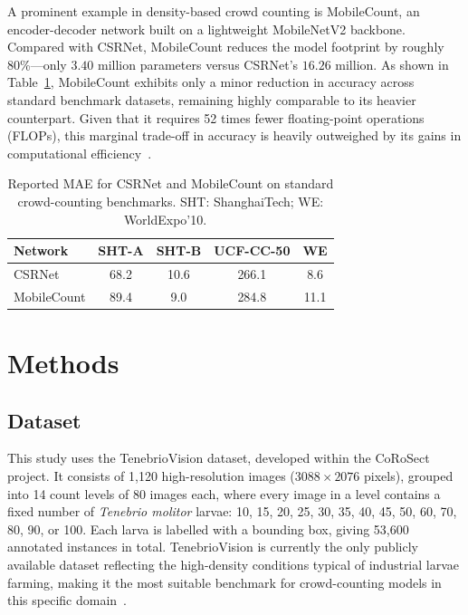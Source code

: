 \documentclass[conference]{IEEEtran}
\begin{document}
A prominent example in density-based crowd counting is MobileCount, an
encoder-decoder network built on a lightweight MobileNetV2 backbone. Compared
with CSRNet, MobileCount reduces the model footprint by roughly 80\%---only
$3.40$ million parameters versus CSRNet's $16.26$ million. As shown in
Table~\ref{tab:lit_table}, MobileCount exhibits only a minor reduction in
accuracy across standard benchmark datasets, remaining highly comparable to its
heavier counterpart. Given that it requires 52 times fewer floating-point
operations (FLOPs), this marginal trade-off in accuracy is heavily outweighed by
its gains in computational efficiency~\cite{wang2020mobilecount}.

\begin{table}[t]
    \centering
    \caption{Reported MAE for CSRNet and MobileCount on standard
    crowd-counting benchmarks. SHT: ShanghaiTech; WE: WorldExpo'10.
    ~\cite{wang2020mobilecount, li2018csrnet}}
    \label{tab:lit_table}
    \footnotesize
    \setlength{\tabcolsep}{5pt}
    \begin{tabular}{lcccc}
        \toprule
        Network     & SHT-A & SHT-B & UCF-CC-50 & WE \\
        \midrule
        CSRNet      & 68.2 & 10.6 & 266.1 & 8.6  \\
        MobileCount & 89.4 & 9.0  & 284.8 & 11.1 \\
        \bottomrule
    \end{tabular}
\end{table}

\section{Methods}
\subsection{Dataset}
This study uses the TenebrioVision dataset, developed within the CoRoSect
project. It consists of 1{,}120 high-resolution images ($3088 \times 2076$
pixels), grouped into 14 count levels of 80 images each, where every image in a
level contains a fixed number of \textit{Tenebrio molitor} larvae: 10, 15, 20,
25, 30, 35, 40, 45, 50, 60, 70, 80, 90, or 100. Each larva is labelled with a
bounding box, giving 53{,}600 annotated instances in total. TenebrioVision is
currently the only publicly available dataset reflecting the high-density
conditions typical of industrial larvae farming, making it the most suitable
benchmark for crowd-counting models in this specific
domain~\cite{Papadopoulos2024TenebrioVision}.
\end{document}

